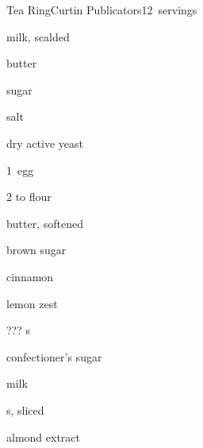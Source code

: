 \begin{recipe}{Tea Ring\FIXME}{Curtin Publicators}{12~servings}

\begin{ingredients}
\item \C{\twothird} milk, scalded
\item \C{\quarter} butter
\item \C{\quarter} sugar
\item \tp{\half} salt
\item \tp{2\quarter} dry active yeast
\item 1~egg
\item 2\half{} to  flour
\item {} butter, softened
\item \C{\half} brown sugar
\item {} cinnamon
\item {} lemon zest
\item ??? s
\item \C{\half} 
\item \C{\half} confectioner's sugar
\item {} milk
\item {} s, sliced
\item \tp{\half} almond extract
\end{ingredients}


\end{recipe}
